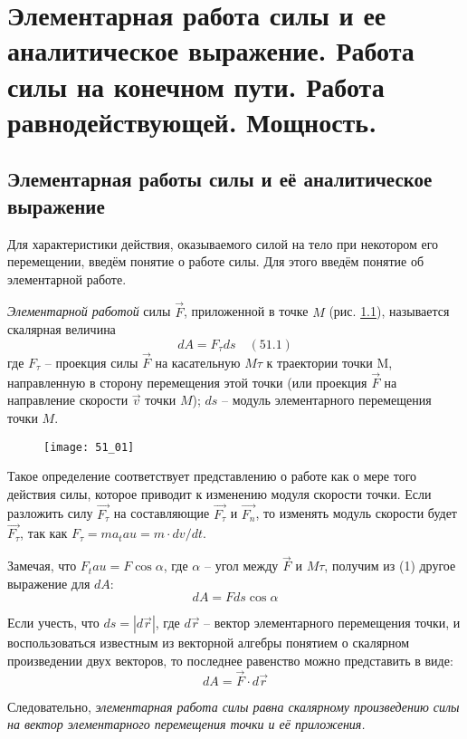 \chapter{Элементарная работа силы и ее аналитическое выражение. Работа силы на
конечном пути. Работа равнодействующей. Мощность.}

\section{Элементарная работы силы и её аналитическое выражение}
Для характеристики действия, оказываемого силой на тело при некотором его 
перемещении, введём понятие о работе силы. Для этого введём понятие об 
элементарной работе.

\emph{Элементарной работой} силы \( \vec{F} \), приложенной в точке 
\( M \) (рис. \ref{pic51_01}), называется скалярная величина
\[ dA = F_\tau ds \quad (51.1) \]
где \( F_\tau \) -- проекция силы \( \vec{F} \) на касательную \( M\tau \) 
к траектории точки M, направленную в сторону перемещения этой точки 
(или проекция \( \vec{F} \) на направление скорости \( \vec{v} \) точки 
\( M \)); \( ds \) -- модуль элементарного перемещения точки \( M \).

\begin{figure}[h!]
    \texttt{[image: 51\_01]}
    \parbox{.47\textwidth}{\caption{} \label{pic51_01}}
\end{figure}

Такое определение соответствует представлению о работе как о мере того 
действия силы, которое приводит к изменению модуля скорости точки. Если 
разложить силу \( \vec{F_\tau} \) на составляющие \( \vec{F_\tau} \) и 
\( \vec{F_n} \), то изменять модуль скорости будет \( \vec{F_\tau} \), 
так как \( F_\tau = ma_tau = m\cdot dv/dt \).

Замечая, что \( F_tau = F\cos\alpha \), где \( \alpha \) -- угол между 
\( \vec{F} \) и \( M\tau \), получим из (1) другое выражение для \( dA \):
\[ dA = Fds\cos\alpha \]

Если учесть, что \( ds = |d\vec{r}| \), где \( d\vec{r} \) -- вектор 
элементарного перемещения точки, и воспользоваться известным из векторной 
алгебры понятием о скалярном произведении двух векторов, то последнее 
равенство можно представить в виде:
\[ dA = \vec{F}\cdot d\vec{r} \]

Следовательно, \emph{элементарная работа силы равна скалярному произведению 
силы на вектор элементарного перемещения точки и её приложения.}


